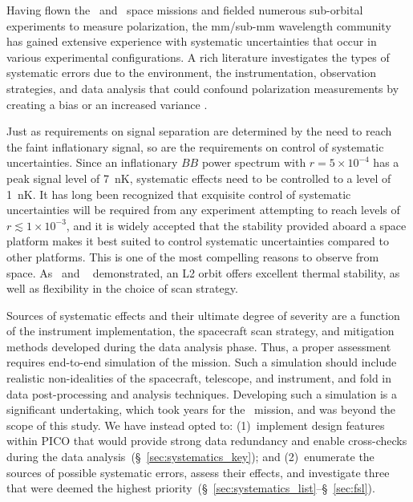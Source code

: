 \documentclass[PICOReport.tex]{subfiles}
\begin{document}
Having flown the \wmap\ and \planck\ space missions and fielded numerous sub-orbital experiments to measure polarization, the mm/sub-mm wavelength community has gained extensive experience with systematic uncertainties that occur in various experimental configurations. A rich literature investigates the types of systematic errors due to the environment, the instrumentation, observation strategies, and data analysis that could confound polarization measurements by creating a bias or an increased variance \cite{hu03,shimon2008,yadav2010,Griffiths2014,LFI_systematics,Kaplan2002,Miller2009,Pagano2009,SO_sys_optical,SO_sys_detector, bicep_systematics,SPIDER_systematics}.%

Just as requirements on signal separation %
are determined by the need to reach the faint inflationary signal, so are the requirements on control of systematic uncertainties. Since an inflationary $BB$ power spectrum with $r = 5 \times 10^{-4}$ has a peak signal level of 7~nK, systematic effects need to be controlled to a level of 1~nK. It has long been recognized that exquisite control of systematic uncertainties will be required from any experiment attempting to reach levels of $r \lesssim 1\times 10^{-3}$, and it is widely accepted that the stability provided aboard a space platform makes it best suited to control systematic uncertainties compared to other platforms. This is one of the most compelling reasons to observe from space.  As \wmap\ and \planck~ demonstrated, an L2 orbit offers excellent thermal stability, as well as flexibility in the choice of scan strategy.  

Sources of systematic effects and their ultimate degree of severity are a function of the instrument implementation, the spacecraft scan strategy, and mitigation methods developed during the data analysis phase. Thus, a proper assessment requires end-to-end simulation of the mission. Such a simulation should include realistic non-idealities of the spacecraft, telescope, and instrument, and fold in data post-processing and analysis techniques. Developing such a simulation is a significant undertaking, which took years  for the \planck\ mission, and was beyond the scope of this study. We have instead opted to: (1)~implement design features within PICO that would provide strong data redundancy and enable cross-checks during the data analysis~(\S~\ref{sec:systematics_key}); and (2)~enumerate the sources of possible systematic errors, assess their effects, and investigate three that were deemed the highest priority~(\S~\ref{sec:systematics_list}--\S~\ref{sec:fsl}). 
\end{document}
